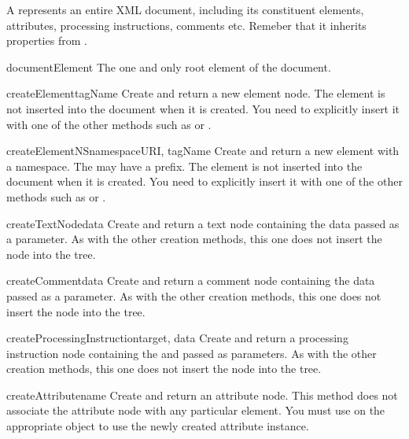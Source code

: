 A  represents an entire XML document, including its
constituent elements, attributes, processing instructions, comments
etc.  Remeber that it inherits properties from .

\begin{memberdesc}[Document]{documentElement}
The one and only root element of the document.
\end{memberdesc}

\begin{methoddesc}[Document]{createElement}{tagName}
Create and return a new element node.  The element is not inserted
into the document when it is created.  You need to explicitly insert
it with one of the other methods such as  or
.
\end{methoddesc}

\begin{methoddesc}[Document]{createElementNS}{namespaceURI, tagName}
Create and return a new element with a namespace.  The
 may have a prefix.  The element is not inserted into the
document when it is created.  You need to explicitly insert it with
one of the other methods such as  or
.
\end{methoddesc}

\begin{methoddesc}[Document]{createTextNode}{data}
Create and return a text node containing the data passed as a
parameter.  As with the other creation methods, this one does not
insert the node into the tree.
\end{methoddesc}

\begin{methoddesc}[Document]{createComment}{data}
Create and return a comment node containing the data passed as a
parameter.  As with the other creation methods, this one does not
insert the node into the tree.
\end{methoddesc}

\begin{methoddesc}[Document]{createProcessingInstruction}{target, data}
Create and return a processing instruction node containing the
 and  passed as parameters.  As with the other
creation methods, this one does not insert the node into the tree.
\end{methoddesc}

\begin{methoddesc}[Document]{createAttribute}{name}
Create and return an attribute node.  This method does not associate
the attribute node with any particular element.  You must use
 on the appropriate  object
to use the newly created attribute instance.
\end{methoddesc}


